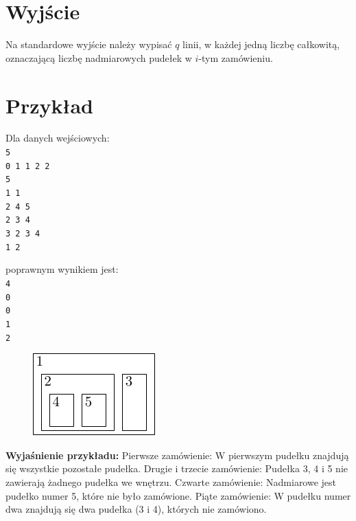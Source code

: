 \documentclass[10pt]{article}
\begin{document}

    \section*{Wyjście}
    
    Na standardowe wyjście należy wypisać $q$ linii, w każdej jedną liczbę całkowitą, oznaczającą liczbę nadmiarowych pudełek w $i$-tym zamówieniu.


    \section*{Przykład}
    
    \noindent
    \begin{minipage}[t]{0.5\textwidth}
        Dla danych wejściowych:\vspace{1ex}\\
        \texttt{5\\0 1 1 2 2\\5\\1 1\\2 4 5\\2 3 4\\3 2 3 4\\1 2}
    \end{minipage}
    \begin{minipage}[t]{0.5\textwidth}
        poprawnym wynikiem jest:\vspace{1ex}\\
        \texttt{4\\0\\0\\1\\2}       
    \end{minipage}
    
    
    \begin{figure}
        \vspace{-3ex}
        \includegraphics{pudrys-1.pdf}
    \end{figure}
    \vspace{2ex}
    \noindent\textbf{Wyjaśnienie przykładu:} Pierwsze zamówienie: W pierwszym pudełku znajdują się wszystkie pozostałe pudełka. Drugie i trzecie zamówienie: Pudełka 3, 4 i 5 nie zawierają żadnego pudełka we wnętrzu. Czwarte zamówienie: Nadmiarowe jest pudełko numer 5, które nie było zamówione. Piąte zamówienie: W pudełku numer dwa znajdują się dwa pudełka (3 i 4), których nie zamówiono.
    
\end{document}
